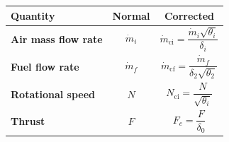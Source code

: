 \documentclass[
]{book}
\begin{document}
\begin{longtable}[]{@{}lcc@{}}
\toprule
\begin{minipage}[b]{0.43\columnwidth}\raggedright
\textbf{Quantity}\strut
\end{minipage} & \begin{minipage}[b]{0.24\columnwidth}\centering
\textbf{Normal}\strut
\end{minipage} & \begin{minipage}[b]{0.24\columnwidth}\centering
\textbf{Corrected}\strut
\end{minipage}\tabularnewline
\midrule
\endhead
\begin{minipage}[t]{0.43\columnwidth}\raggedright
\textbf{Air mass flow rate}\strut
\end{minipage} & \begin{minipage}[t]{0.24\columnwidth}\centering
\[{\dot{m}}_{i}\]\strut
\end{minipage} & \begin{minipage}[t]{0.24\columnwidth}\centering
\[{\dot{m}}_{\mathrm{ci}} = \frac{{\dot{m}}_{i}\sqrt{\theta_{i}}}{\delta_{i}}\]\strut
\end{minipage}\tabularnewline
\begin{minipage}[t]{0.43\columnwidth}\raggedright
\textbf{Fuel flow rate}\strut
\end{minipage} & \begin{minipage}[t]{0.24\columnwidth}\centering
\[{\dot{m}}_{f}\]\strut
\end{minipage} & \begin{minipage}[t]{0.24\columnwidth}\centering
\[{\dot{m}}_{\mathrm{cf}} = \frac{{\dot{m}}_{f}}{\delta_{2}\sqrt{\theta_{2}}}\]\strut
\end{minipage}\tabularnewline
\begin{minipage}[t]{0.43\columnwidth}\raggedright
\textbf{Rotational speed}\strut
\end{minipage} & \begin{minipage}[t]{0.24\columnwidth}\centering
\[N\]\strut
\end{minipage} & \begin{minipage}[t]{0.24\columnwidth}\centering
\[N_{\mathrm{ci}} = \frac{N}{\sqrt{\theta_{i}}}\]\strut
\end{minipage}\tabularnewline
\begin{minipage}[t]{0.43\columnwidth}\raggedright
\textbf{Thrust}\strut
\end{minipage} & \begin{minipage}[t]{0.24\columnwidth}\centering
\[F\]\strut
\end{minipage} & \begin{minipage}[t]{0.24\columnwidth}\centering
\[F_{c} = \frac{F}{\delta_{0}}\]\strut
\end{minipage}\tabularnewline
\bottomrule
\end{longtable}
\end{document}
